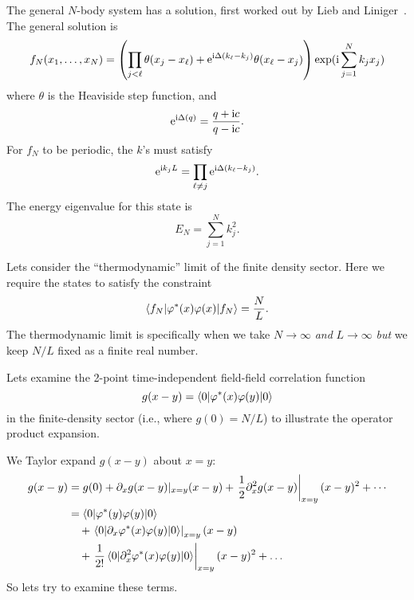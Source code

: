 The general $N$-body system has a solution, first worked out by Lieb and
Liniger~\cite{Lieb:1963rt,Lieb:1963zz}. The general solution is
\begin{equation}
f_{N}(x_{1},\dots,x_{N})
=
\left(\prod_{j<\ell}
\theta(x_{j}-x_{\ell})+\mathrm{e}^{\mathrm{i}\Delta(k_{\ell}-k_{j})}\theta(x_{\ell}-x_{j})\right)
\exp(\mathrm{i}\sum^{N}_{j=1}k_{j}x_{j})
\end{equation}
where $\theta$ is the Heaviside step function, and
\begin{equation}
\mathrm{e}^{\mathrm{i}\Delta(q)}=\frac{q+\mathrm{i} c}{q-\mathrm{i} c}.
\end{equation}
For $f_{N}$ to be periodic, the $k$'s must satisfy
\begin{equation}
\mathrm{e}^{\mathrm{i} k_{j}L} = \prod_{\ell\neq j}\mathrm{e}^{\mathrm{i}\Delta(k_{\ell}-k_{j})}.
\end{equation}
The energy eigenvalue for this state is 
\begin{equation}
E_{N}=\sum^{N}_{j=1}k_{j}^{2}.
\end{equation}


Lets consider the ``thermodynamic'' limit of the finite density
sector. Here we require the states to satisfy the constraint
\begin{equation}
\braket{f_{N}|\varphi^{*}(x)\varphi(x)|f_{N}}=\frac{N}{L}.
\end{equation}
The thermodynamic limit is specifically when we take $N\to\infty$
\emph{and} $L\to\infty$ \emph{but} we keep $N/L$ fixed as a finite real
number. 


Lets examine the 2-point time-independent field-field correlation
function
\begin{equation}
g(x-y)=\braket{0|\varphi^{*}(x)\varphi(y)|0}
\end{equation}
in the finite-density sector (i.e., where $g(0)=N/L$) to illustrate the
operator product expansion.

We Taylor expand $g(x-y)$ about $x=y$:
\begin{subequations}
\begin{align}
g(x-y)
&= g(0)
   + \partial_{x}g(x-y)|_{x=y}(x-y) 
   + \left.\frac{1}{2}\partial_{x}^{2}g(x-y)\right|_{x=y}(x-y)^{2}
   + \cdots\\
&= \braket{0|\varphi^{*}(y)\varphi(y)|0}\\
&\quad + \left.\braket{0|\partial_{x}\varphi^{*}(x)\varphi(y)|0}\right|_{x=y} (x-y)\nonumber\\
&\quad + \left.\frac{1}{2!}\braket{0|\partial_{x}^{2}\varphi^{*}(x)\varphi(y)|0}\right|_{x=y}
   (x-y)^{2}
   + \dots\nonumber
\end{align}
\end{subequations}
So lets try to examine these terms.

